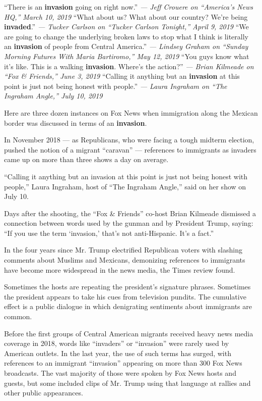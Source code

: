 ``There is an \textbf{invasion} going on right now.'' \emph{--- Jeff
Crouere on ``America's News HQ,'' March 10, 2019} ``What about us? What
about our country? We're being \textbf{invaded}.'' \emph{--- Tucker
Carlson on ``Tucker Carlson Tonight,'' April 9, 2019} ``We are going to
change the underlying broken laws to stop what I think is literally an
\textbf{invasion} of people from Central America.'' \emph{--- Lindsey
Graham on ``Sunday Morning Futures With Maria Bartiromo,'' May 12, 2019}
``You guys know what it's like. This is a walking \textbf{invasion}.
Where's the action?'' \emph{--- Brian Kilmeade on ``Fox \& Friends,''
June 3, 2019} ``Calling it anything but an \textbf{invasion} at this
point is just not being honest with people.'' \emph{--- Laura Ingraham
on ``The Ingraham Angle,'' July 10, 2019}

Here are three dozen instances on Fox News when immigration along the
Mexican border was discussed in terms of an \textbf{invasion}.

In November 2018 --- as Republicans, who were facing a tough midterm
election, pushed the notion of a migrant ``caravan'' --- references to
immigrants as invaders came up on more than three shows a day on
average.

``Calling it anything but an invasion at this point is just not being
honest with people,'' Laura Ingraham, host of ``The Ingraham Angle,''
said on her show on July 10.

Days after the shooting, the ``Fox \& Friends'' co-host Brian Kilmeade
dismissed a connection between words used by the gunman and by President
Trump, saying: ``If you use the term `invasion,' that's not
anti-Hispanic. It's a fact.''

In the four years since Mr. Trump electrified Republican voters with
slashing comments about Muslims and Mexicans, demonizing references to
immigrants have become more widespread in the news media, the Times
review found.

Sometimes the hosts are repeating the president's signature phrases.
Sometimes the president appears to take his cues from television
pundits. The cumulative effect is a public dialogue in which denigrating
sentiments about immigrants are common.

Before the first groups of Central American migrants received heavy news
media coverage in 2018, words like ``invaders'' or ``invasion'' were
rarely used by American outlets. In the last year, the use of such terms
has surged, with references to an immigrant ``invasion'' appearing on
more than 300 Fox News broadcasts. The vast majority of those were
spoken by Fox News hosts and guests, but some included clips of Mr.
Trump using that language at rallies and other public appearances.

